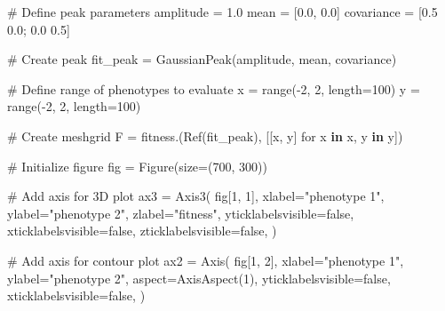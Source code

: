 \documentclass[
]{scrartcl}
\newenvironment{Shaded}{\begin{snugshade}}{\end{snugshade}}
\newcommand{\CommentTok}[1]{\textcolor[rgb]{0.37,0.37,0.37}{#1}}
\newcommand{\ConstantTok}[1]{\textcolor[rgb]{0.56,0.35,0.01}{#1}}
\newcommand{\FloatTok}[1]{\textcolor[rgb]{0.68,0.00,0.00}{#1}}
\newcommand{\FunctionTok}[1]{\textcolor[rgb]{0.28,0.35,0.67}{#1}}
\newcommand{\KeywordTok}[1]{\textcolor[rgb]{0.00,0.23,0.31}{\textbf{#1}}}
\newcommand{\NormalTok}[1]{\textcolor[rgb]{0.00,0.23,0.31}{#1}}
\newcommand{\OperatorTok}[1]{\textcolor[rgb]{0.37,0.37,0.37}{#1}}
\newcommand{\StringTok}[1]{\textcolor[rgb]{0.13,0.47,0.30}{#1}}
\begin{document}
\begin{Shaded}
\begin{Highlighting}[]
\CommentTok{\# Define peak parameters}
\NormalTok{amplitude }\OperatorTok{=} \FloatTok{1.0}
\NormalTok{mean }\OperatorTok{=}\NormalTok{ [}\FloatTok{0.0}\NormalTok{, }\FloatTok{0.0}\NormalTok{]}
\NormalTok{covariance }\OperatorTok{=}\NormalTok{ [}\FloatTok{0.5} \FloatTok{0.0}\NormalTok{; }\FloatTok{0.0} \FloatTok{0.5}\NormalTok{]}

\CommentTok{\# Create peak}
\NormalTok{fit\_peak }\OperatorTok{=} \FunctionTok{GaussianPeak}\NormalTok{(amplitude, mean, covariance)}

\CommentTok{\# Define range of phenotypes to evaluate}
\NormalTok{x }\OperatorTok{=} \FunctionTok{range}\NormalTok{(}\OperatorTok{{-}}\FloatTok{2}\NormalTok{, }\FloatTok{2}\NormalTok{, length}\OperatorTok{=}\FloatTok{100}\NormalTok{)}
\NormalTok{y }\OperatorTok{=} \FunctionTok{range}\NormalTok{(}\OperatorTok{{-}}\FloatTok{2}\NormalTok{, }\FloatTok{2}\NormalTok{, length}\OperatorTok{=}\FloatTok{100}\NormalTok{)}

\CommentTok{\# Create meshgrid}
\NormalTok{F }\OperatorTok{=} \FunctionTok{fitness}\NormalTok{.(}\FunctionTok{Ref}\NormalTok{(fit\_peak), [[x, y] for x }\KeywordTok{in}\NormalTok{ x, y }\KeywordTok{in}\NormalTok{ y])}

\CommentTok{\# Initialize figure}
\NormalTok{fig }\OperatorTok{=} \FunctionTok{Figure}\NormalTok{(size}\OperatorTok{=}\NormalTok{(}\FloatTok{700}\NormalTok{, }\FloatTok{300}\NormalTok{))}

\CommentTok{\# Add axis for 3D plot}
\NormalTok{ax3 }\OperatorTok{=} \FunctionTok{Axis3}\NormalTok{(}
\NormalTok{    fig[}\FloatTok{1}\NormalTok{, }\FloatTok{1}\NormalTok{],}
\NormalTok{    xlabel}\OperatorTok{=}\StringTok{"phenotype 1"}\NormalTok{,}
\NormalTok{    ylabel}\OperatorTok{=}\StringTok{"phenotype 2"}\NormalTok{,}
\NormalTok{    zlabel}\OperatorTok{=}\StringTok{"fitness"}\NormalTok{,}
\NormalTok{    yticklabelsvisible}\OperatorTok{=}\ConstantTok{false}\NormalTok{,}
\NormalTok{    xticklabelsvisible}\OperatorTok{=}\ConstantTok{false}\NormalTok{,}
\NormalTok{    zticklabelsvisible}\OperatorTok{=}\ConstantTok{false}\NormalTok{,}
\NormalTok{)}

\CommentTok{\# Add axis for contour plot}
\NormalTok{ax2 }\OperatorTok{=} \FunctionTok{Axis}\NormalTok{(}
\NormalTok{    fig[}\FloatTok{1}\NormalTok{, }\FloatTok{2}\NormalTok{],}
\NormalTok{    xlabel}\OperatorTok{=}\StringTok{"phenotype 1"}\NormalTok{,}
\NormalTok{    ylabel}\OperatorTok{=}\StringTok{"phenotype 2"}\NormalTok{,}
\NormalTok{    aspect}\OperatorTok{=}\FunctionTok{AxisAspect}\NormalTok{(}\FloatTok{1}\NormalTok{),}
\NormalTok{    yticklabelsvisible}\OperatorTok{=}\ConstantTok{false}\NormalTok{,}
\NormalTok{    xticklabelsvisible}\OperatorTok{=}\ConstantTok{false}\NormalTok{,}
\NormalTok{)}


\end{Highlighting}
\end{Shaded}
\end{document}

